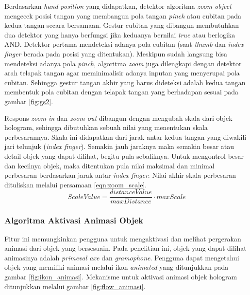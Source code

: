 			Berdasarkan \textit{hand position} yang didapatkan, detektor algoritma \textit{zoom object} mengecek posisi tangan yang membangun pola tangan \textit{pinch} atau cubitan pada kedua tangan secara bersamaan. Gestur cubitan yang dibangun membutuhkan dua detektor yang hanya berfungsi jika keduanya bernilai \textit{true} atau berlogika AND. Detektor pertama mendeteksi adanya pola cubitan (saat \textit{thumb} dan \textit{index finger} berada pada posisi yang ditentukan). Meskipun sudah langsung bisa mendeteksi adanya pola \textit{pinch}, algoritma \textit{zoom} juga dilengkapi dengan detektor arah telapak tangan agar meminimalisir adanya inputan yang menyerupai pola cubitan. Sehingga gestur tangan akhir yang harus dideteksi adalah kedua tangan membentuk pola cubitan dengan telapak tangan yang berhadapan sesuai pada gambar \ref{fig:gs2}.
			
			Respons \textit{zoom in} dan \textit{zoom out} dibangun dengan mengubah skala dari objek hologram, sehingga dibutuhkan sebuah nilai yang menentukan skala perbesarannya. Skala ini didapatkan dari jarak antar kedua tangan yang diwakili jari telunjuk (\textit{index finger}). Semakin jauh jaraknya maka semakin besar atau detail objek yang dapat dilihat, begitu pula sebaliknya. Untuk mengontrol besar dan kecilnya objek, maka ditentukan pula nilai maksimal dan minimal perbesaran berdasarkan jarak antar \textit{index finger}. Nilai akhir skala perbesaran dituliskan melalui persamaan \ref{eqn:zoom_scale}.
			\begin{equation}
				ScaleValue = \frac{distanceValue}{maxDistance} \cdot maxScale
				\label{eqn:zoom_scale}
			\end{equation}
		\vspace{0.75ex}
		
		\subsubsection{Algoritma Aktivasi Animasi Objek}\label{section:aktivasi_animasi}
		\vspace{0.5ex}
			Fitur ini memungkinkan pengguna untuk mengaktivasi dan melihat pergerakan animasi dari objek yang bersesuain. Pada penelitian ini, objek yang dapat dilihat animasinya adalah \textit{primeval axe} dan \textit{gramophone}. Pengguna dapat mengetahui objek yang memiliki animasi melalui ikon \textit{animated} yang ditunjukkan pada gambar \ref{fig:ikon_animasi}. Mekanisme untuk aktivasi animasi objek hologram ditunjukkan melalui gambar \ref{fig:flow_animasi}.
		
